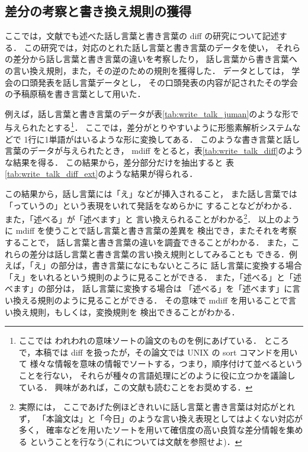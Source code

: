 \subsection{差分の考察と書き換え規則の獲得}
\label{sec:kakikae}

ここでは，文献\cite{murata_kaiho_2001}でも述べた話し言葉と書き言葉の diff の研究について記述する．
この研究では，対応のとれた話し言葉と書き言葉のデータを使い，
それらの差分から話し言葉と書き言葉の違いを考察したり，
話し言葉から書き言葉への言い換え規則，また，その逆のための規則を獲得した．
データとしては，
学会の口頭発表を話し言葉データとし，
その口頭発表の内容が記されたその学会の予稿原稿を書き言葉として用いた．

例えば，話し言葉と書き言葉のデータが表\ref{tab:write_talk_juman}のような形で与えられたとする\footnote{ここでは
われわれの意味ソートの論文\cite{murata_msort_nlp}のものを例にあげている．
ところで，本稿では diff を扱ったが，その論文では UNIX の sort コマンドを用いて
様々な情報を意味の情報でソートする，つまり，順序付けて並べるということを行ない，
それらが種々の言語処理にどのように役に立つかを議論している．
興味があれば，この文献も読むことをお奨めする．}．
ここでは，差分がとりやすいように形態素解析システムなどで
1行に1単語がはいるような形に変換してある．
このような書き言葉と話し言葉のデータが与えられたとき，
mdiff をとると，表\ref{tab:write_talk_diff}のような結果を得る．
この結果から，差分部分だけを抽出すると
表\ref{tab:write_talk_diff_ext}のような結果が得られる．

この結果から，話し言葉には「え」などが挿入されること，
また話し言葉では「っていうの」という表現をいれて発話をなめらかに
することなどがわかる．また，「述べる」が「述べます」と
言い換えられることがわかる\footnote{実際には，
ここであげた例ほどきれいに話し言葉と書き言葉は対応がとれず，
「本論文は」と「今日」のような言い換え表現としてはよくない対応が多く，
確率などを用いたソートを用いて確信度の高い良質な差分情報を集める
ということを行なう(これについては文献\cite{murata_kaiho_2001,murata_nl2001_henkei}を参照せよ)．}．
以上のように mdiff を使うことで話し言葉と書き言葉の差異を
検出でき，またそれを考察することで，
話し言葉と書き言葉の違いを調査できることがわかる．
また，これらの差分は話し言葉と書き言葉の言い換え規則としてみることも
できる．例えば，「え」の部分は，書き言葉になにもないところに
話し言葉に変換する場合「え」をいれるという規則のように見ることができる．
また，「述べる」と「述べます」の部分は，
話し言葉に変換する場合は
「述べる」を「述べます」に言い換える規則のように見ることができる．
その意味で mdiff を用いることで言い換え規則，もしくは，変換規則を
検出できることがわかる．


